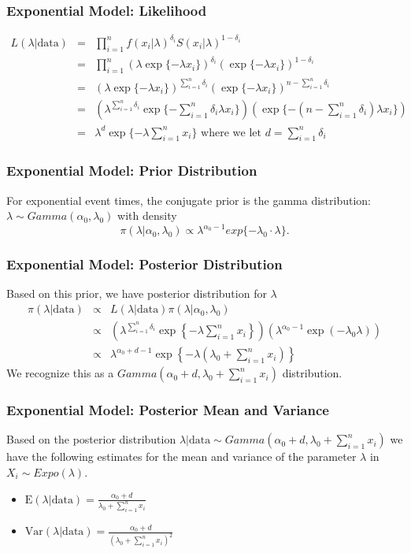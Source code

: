 \documentclass{beamer}
\begin{document}
\begin{frame}
\frametitle{Exponential Model: Likelihood}
\begin{eqnarray*}
L(\lambda|\text{data}) &=& \prod_{i=1}^{n} f(x_i|\lambda)^{\delta_i}S(x_i|\lambda)^{1-\delta_i} \\
&=& \prod_{i=1}^{n} (\lambda \exp\{-\lambda x_i\})^{\delta_i}(\exp\{-\lambda x_i\})^{1-\delta_i} \\
&=& (\lambda \exp\{-\lambda x_i\})^{\sum_{i=1}^{n}\delta_i}(\exp\{-\lambda x_i\})^{n-\sum_{i=1}^{n}\delta_i} \\
&=& (\lambda^{\sum_{i=1}^{n}\delta_i} \exp\{-\sum_{i=1}^{n}\delta_i\lambda x_i\})(\exp\{-(n-\sum_{i=1}^{n}\delta_i)\lambda x_i\}) \\
&=& \lambda^{d}\exp\{-\lambda \sum_{i=1}^{n}x_i\} \text{ where we let }d = \sum_{i=1}^{n}\delta_i
\end{eqnarray*}
\end{frame}

\begin{frame}
\frametitle{Exponential Model: Prior Distribution}
For exponential event times, the conjugate prior is the gamma distribution: $\lambda \sim Gamma(\alpha_0, \lambda_0)$ with density
$$\pi(\lambda|\alpha_0,\lambda_0) \propto \lambda^{\alpha_0-1}exp\{-\lambda_0 \cdot \lambda\}.$$
\end{frame}

\begin{frame}
\frametitle{Exponential Model: Posterior Distribution}
Based on this prior, we have posterior distribution for $\lambda$
\begin{eqnarray*}
\pi(\lambda|\text{data}) &\propto& L(\lambda|\text{data}) \pi(\lambda|\alpha_0,\lambda_0) \\
&\propto& \left(\lambda^{\sum_{i=1}^n \delta_i} \exp\left\{-\lambda \sum_{i=1}^n x_i \right\} \right) \left(\lambda^{\alpha_0-1}\exp(-\lambda_0\lambda) \right) \\
&\propto& \lambda^{\alpha_0+d - 1}\exp\left\{-\lambda(\lambda_0 + \sum_{i=1}^n x_i ) \right\}
\end{eqnarray*}
We recognize this as a \color{orange}$Gamma(\alpha_0 + d, \lambda_0 + \sum_{i=1}^{n}x_i)$ \color{black}distribution. 
\end{frame}

\begin{frame}
\frametitle{Exponential Model: Posterior Mean and Variance}
Based on the posterior distribution $\lambda|\text{data} \sim Gamma(\alpha_0 + d, \lambda_0 + \sum_{i=1}^{n}x_i)$ we have the following estimates for the mean and variance of the parameter $\lambda$ in $X_i \sim Expo(\lambda)$.
\begin{itemize}
\item $\text{E}(\lambda|\text{data}) = \frac{\alpha_0 + d}{\lambda_0 + \sum_{i=1}^n x_i}$
\item $\text{Var}(\lambda|\text{data}) = \frac{\alpha_0 + d}{(\lambda_0 + \sum_{i=1}^n x_i)^2}$
\end{itemize} 
\end{frame}
\end{document}

